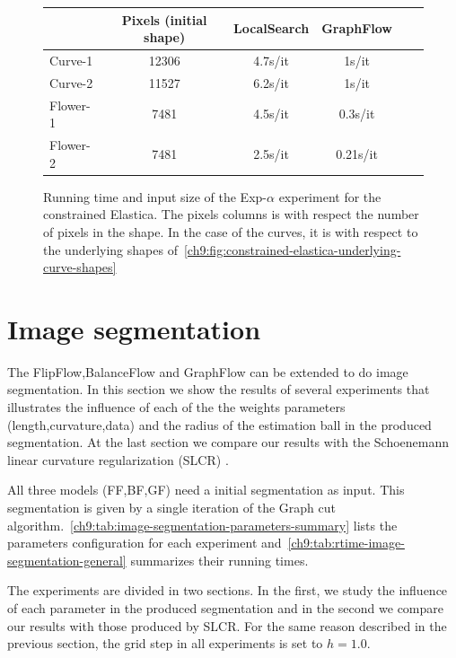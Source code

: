 \begin{figure}
\center
\captionsetup{type=table}
\begin{tabular}{|l|c|c|c|c|c|}
\hline
& Pixels (initial shape) & LocalSearch & GraphFlow \\
\hline
Curve-1 & 12306 & 4.7s/it & 1s/it\\
Curve-2 & 11527 & 6.2s/it & 1s/it\\
Flower-1  & 7481 & 4.5s/it & 0.3s/it \\
Flower-2 & 7481 & 2.5s/it & 0.21s/it\\
\hline
\end{tabular}
\caption{Running time and input size of the Exp-$\alpha$ experiment for the constrained Elastica. The pixels columns is with respect the number of pixels in the shape. In the case of the curves, it is with respect to the underlying shapes of~\cref{ch9:fig:constrained-elastica-underlying-curve-shapes}}
\label{ch9:tab:rtime-constrained-elastica-general} 
\end{figure}


\section{Image segmentation}

The FlipFlow,BalanceFlow and GraphFlow can be extended to do image segmentation. In this section we show the results of several experiments that illustrates the influence of each of the the weights parameters (length,curvature,data) and the radius of the estimation ball in the produced segmentation. At the last section we compare our results with the Schoenemann linear curvature regularization (SLCR) \cite{schoenemann09linear}. 

All three models (FF,BF,GF) need a initial segmentation as input. This segmentation is given by a single iteration of the Graph cut algorithm.~\cref{ch9:tab:image-segmentation-parameters-summary} lists the parameters configuration for each experiment and~\cref{ch9:tab:rtime-image-segmentation-general} summarizes their running times. 

The experiments are divided in two sections. In the first, we study the influence of each parameter in the produced segmentation and in the second we compare our results with those produced by SLCR. For the same reason described in the previous section, the grid step in all experiments is set to $h=1.0$.


